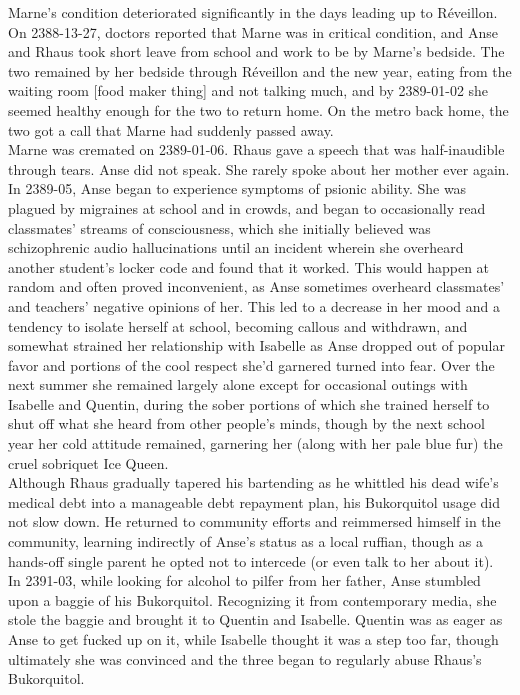 \documentclass[12pt,a4paper,twocolumn]{article}
\begin{document}
	\indent Marne's condition deteriorated significantly in the days leading up to Réveillon. On 2388-13-27, doctors reported that Marne was in critical condition, and Anse and Rhaus took short leave from school and work to be by Marne's bedside. The two remained by her bedside through Réveillon and the new year, eating from the waiting room [food maker thing] and not talking much, and by 2389-01-02 she seemed healthy enough for the two to return home. On the metro back home, the two got a call that Marne had suddenly passed away.\\
\indent Marne was cremated on 2389-01-06. Rhaus gave a speech that was half-inaudible through tears. Anse did not speak. She rarely spoke about her mother ever again.\\
\indent In 2389-05, Anse began to experience symptoms of psionic ability. She was plagued by migraines at school and in crowds, and began to occasionally read classmates' streams of consciousness, which she initially believed was schizophrenic audio hallucinations until an incident wherein she overheard another student's locker code and found that it worked. This would happen at random and often proved inconvenient, as Anse sometimes overheard classmates' and teachers' negative opinions of her. This led to a decrease in her mood and a tendency to isolate herself at school, becoming callous and withdrawn, and somewhat strained her relationship with Isabelle as Anse dropped out of popular favor and portions of the cool respect she'd garnered turned into fear. Over the next summer she remained largely alone except for occasional outings with Isabelle and Quentin, during the sober portions of which she trained herself to shut off what she heard from other people's minds, though by the next school year her cold attitude remained, garnering her (along with her pale blue fur) the cruel sobriquet Ice Queen.\\
\indent Although Rhaus gradually tapered his bartending as he whittled his dead wife's medical debt into a manageable debt repayment plan, his Bukorquitol usage did not slow down. He returned to community efforts and reimmersed himself in the community, learning indirectly of Anse's status as a local ruffian, though as a hands-off single parent he opted not to intercede (or even talk to her about it).\\
\indent In 2391-03, while looking for alcohol to pilfer from her father, Anse stumbled upon a baggie of his Bukorquitol. Recognizing it from contemporary media, she stole the baggie and brought it to Quentin and Isabelle. Quentin was as eager as Anse to get fucked up on it, while Isabelle thought it was a step too far, though ultimately she was convinced and the three began to regularly abuse Rhaus's Bukorquitol.\\
	
\end{document}
